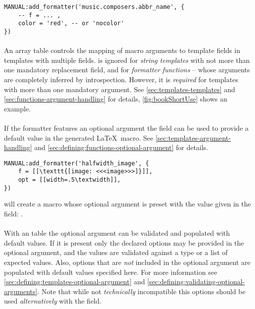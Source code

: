 \documentclass[12pt]{scrartcl}
\begin{document}
\begin{verbatim}
MANUAL:add_formatter('music.composers.abbr_name', {
	-- f = ... ,
	color = 'red', -- or 'nocolor'
})
\end{verbatim}


\paragraph{}

An array table  controls the mapping of macro arguments to template
fields in templates with multiple fields.   is ignored for \emph{string templates} with not more than one mandatory replacement field, and for \emph{formatter functions} -- whose arguments are completely inferred by
introspection.  However, it is \emph{required} for templates with more than one mandatory argument.  See \vref{sec:templates-templates} and
\vref{sec:functions-argument-handling} for details, \vref{fig:bookShortUse} shows an example.


\paragraph{}

If the formatter features an optional argument the  field can be
used to provide a default value in the generated \LaTeX\ macro.  See
\vref{sec:templates-argument-handling} and
\vref{sec:defining:functions-optional-argument} for details.

\begin{verbatim}
MANUAL:add_formatter('halfwidth_image', {
	f = [[\texttt{[image: <<<image>>>]}]],
	opt = [[width=.5\textwidth]],
})
\end{verbatim}

\noindent will create a macro whose optional argument is preset with the value
given in the  field:
\texttt{}.


\paragraph{}

With an  table the optional argument can be validated and
populated with default values.  If it is present only the declared options may
be provided in the optional argument, and the values are validated against a
type or a list of expected values.  Also, options that are \emph{not} included
in the optional argument are populated with default values specified here. For
more information see \vref{sec:defining:templates-optional-argument} and
\vref{sec:defining:validating-optional-arguments}.  Note that while not
\emph{technically} incompatible this options should be used \emph{alternatively}
with the  field.
\end{document}
